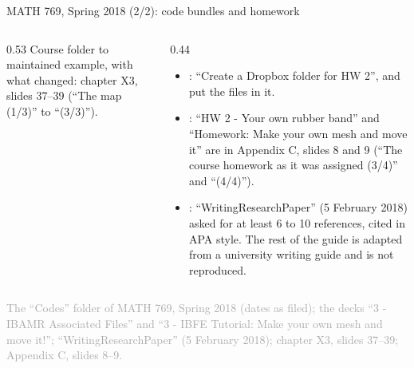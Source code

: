 \documentclass[aspectratio=169,11pt]{beamer}
\newcommand{\sourcecredit}[1]{\vfill\begin{flushright}\tiny\textcolor{DarkGray}{#1}\end{flushright}}
\begin{document}
\begin{frame}{MATH 769, Spring 2018 (2/2): code bundles and homework}
\begin{columns}[T,onlytextwidth]
\begin{column}{0.53\textwidth}
\vspace{1.5mm}
\scriptsize Course folder to maintained example, with what changed: chapter X3, slides 37--39 (``The map (1/3)'' to ``(3/3)'').
\end{column}
\begin{column}{0.44\textwidth}
\footnotesize
\begin{itemize}\setlength{\itemsep}{3pt}
  \item {}: ``Create a Dropbox folder for HW 2'', and put the files in it.
  \item {}: ``HW 2 - Your own rubber band'' and ``Homework: Make your own mesh and move it'' are in Appendix C, slides 8 and 9 (``The course homework as it was assigned (3/4)'' and ``(4/4)'').
  \item {}: ``WritingResearchPaper'' (5 February 2018) asked for at least 6 to 10 references, cited in APA style. The rest of the guide is adapted from a university writing guide and is not reproduced.
\end{itemize}
\end{column}
\end{columns}
\sourcecredit{The ``Codes'' folder of MATH 769, Spring 2018 (dates as filed); the decks ``3 - IBAMR Associated Files'' and ``3 - IBFE Tutorial: Make your own mesh and move it!''; ``WritingResearchPaper'' (5 February 2018); chapter X3, slides 37--39; Appendix C, slides 8--9.}
\end{frame}
\end{document}
